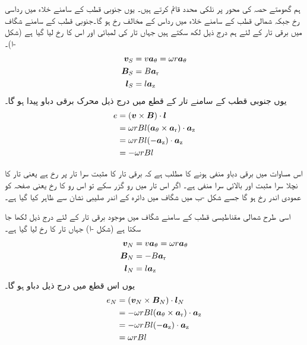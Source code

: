 ہم گھومتے حصہ کی محور پر نلکی محدد قائم کرتے ہیں۔ یوں جنوبی قطب کے سامنے خلاء میں  رداسی رخ جبکہ شمالی  قطب کے سامنے  خلاء میں   رداس کے مخالف رخ ہو گا۔جنوبی قطب کے سامنے شگاف میں برقی تار   کے لئے ہم درج ذیل لکھ سکتے ہیں جہاں تار کی لمبائی  اور اس کا رخ  لیا گیا ہے (شکل -ا)۔
\begin{gather}
\begin{aligned}
{\ensuremath{{\boldsymbol{v}}}}_S&=v {\boldsymbol{a}}_{\theta} =\omega r {\boldsymbol{a}}_{\theta}\\
{{\boldsymbol{B}}}_S&=B {\boldsymbol{a}}_{\textup{r}}\\
{{\boldsymbol{l}}}_S&=l {\boldsymbol{a}}_{\textup{z}}
\end{aligned}
\end{gather}
یوں  جنوبی قطب کے سامنے تار کے قطع  میں درج ذیل محرک برقی دباو پیدا ہو گا۔
\begin{gather}
\begin{aligned}
e&=({{\boldsymbol{v}}} \times {\ensuremath{{\boldsymbol{B}}}}) \cdot {\ensuremath{{\boldsymbol{l}}}}\\
&=\omega r B l  ({\boldsymbol{a}}_{\theta} \times {\boldsymbol{a}}_{\textup{r}}) \cdot {\boldsymbol{a}}_{\textup{z}}\\
&=\omega r B l  (-{\boldsymbol{a}}_{\textup{z}}) \cdot {\boldsymbol{a}}_{\textup{z}}\\
&=-\omega r B l 
\end{aligned}
\end{gather}

اس مساوات میں برقی دباو منفی ہونے کا مطلب ہے کہ برقی تار کا مثبت سرا تار پر  رخ ہے یعنی تار کا نچلا سرا مثبت اور بالائی سرا منفی ہے۔ اگر اس  تار میں  رو گزر سکے تو اس رو کا رخ   یعنی صفحہ کو عمودی اندر رخ ہو گا جسے  شکل -ب میں  شگاف میں دائرہ کے اندر صلیبی نشان سے ظاہر کیا گیا ہے۔ 

اسی طرح شمالی مقناطیسی قطب کے سامنے شگاف میں موجود برقی تار کے لئے درج ذیل لکھا جا سکتا ہے (شکل -ا) جہاں تار کا رخ  لیا گیا ہے۔
\begin{gather}
\begin{aligned}
{\ensuremath{{\boldsymbol{v}}}}_N&=v {\boldsymbol{a}}_{\theta}=\omega r{\boldsymbol{a}}_{\theta}\\
{{\boldsymbol{B}}}_N&=-B {\boldsymbol{a}}_{\textup{r}}\\
{{\boldsymbol{l}}}_N&=l {\boldsymbol{a}}_{\textup{z}}
\end{aligned}
\end{gather}
یوں اس قطع میں درج ذیل دباو ہو گا۔
\begin{gather}
\begin{aligned}
e_N&=({{\boldsymbol{v}}}_N \times {\ensuremath{{\boldsymbol{B}}}}_N)\cdot {\ensuremath{{\boldsymbol{l}}}}_N\\
&=-\omega rB l ({\boldsymbol{a}}_{\theta} \times {\boldsymbol{a}}_{\textup{r}}) \cdot {\boldsymbol{a}}_{\textup{z}}\\
&=-\omega r B l (-{\boldsymbol{a}}_{\textup{z}}) \cdot {\boldsymbol{a}}_{\textup{z}}\\
&=\omega r B l 
\end{aligned}
\end{gather}

